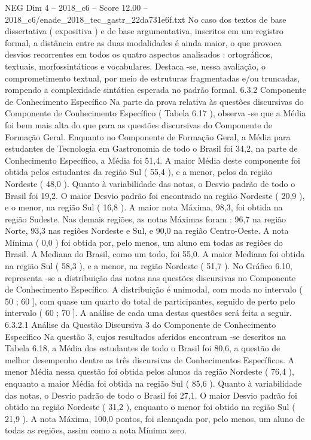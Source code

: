 \begin{textsample}{NEG Dim 4 – 2018\_c6 – Score 12.00 – 2018\_c6/enade\_2018\_tec\_gastr\_22da731e6f.txt}
No caso dos textos de base dissertativa ( expositiva ) e de base argumentativa, inscritos em um registro formal, a distância entre as duas modalidades é ainda maior, o que provoca desvios recorrentes em todos os quatro aspectos analisados : ortográficos, textuais, morfossintáticos e vocabulares.
Destaca -se, nessa avaliação, o comprometimento textual, por meio de estruturas fragmentadas e/ou truncadas, rompendo a complexidade sintática esperada no padrão formal. 6.3.2 Componente de Conhecimento Específico Na parte da prova relativa às questões discursivas do Componente de Conhecimento Específico ( Tabela 6.17 ), observa -se que a Média foi bem mais alta do que para as questões discursivas do Componente de Formação Geral.
Enquanto no Componente de Formação Geral, a Média para estudantes de Tecnologia em Gastronomia de todo o Brasil foi 34,2, na parte de Conhecimento Específico, a Média foi 51,4.
A maior Média deste componente foi obtida pelos estudantes da região Sul ( 55,4 ), e a menor, pelos da região Nordeste ( 48,0 ).
Quanto à variabilidade das notas, o Desvio padrão de todo o Brasil foi 19,2.
O maior Desvio padrão foi encontrado na região Nordeste ( 20,9 ), e o menor, na região Sul ( 16,8 ).
A maior nota Máxima, 98,3, foi obtida na região Sudeste.
Nas demais regiões, as notas Máximas foram : 96,7 na região Norte, 93,3 nas regiões Nordeste e Sul, e 90,0 na região Centro-Oeste.
A nota Mínima ( 0,0 ) foi obtida por, pelo menos, um aluno em todas as regiões do Brasil.
A Mediana do Brasil, como um todo, foi 55,0.
A maior Mediana foi obtida na região Sul ( 58,3 ), e a menor, na região Nordeste ( 51,7 ).
No Gráfico 6.10, representa -se a distribuição das notas nas questões discursivas no Componente de Conhecimento Específico.
A distribuição é unimodal, com moda no intervalo ( 50 ; 60 ], com quase um quarto do total de participantes, seguido de perto pelo intervalo ( 60 ; 70 ].
A análise de cada uma destas questões será feita a seguir. 6.3.2.1 Análise da Questão Discursiva 3 do Componente de Conhecimento Específico Na questão 3, cujos resultados aferidos encontram -se descritos na Tabela 6.18, a Média dos estudantes de todo o Brasil foi 80,6, a questão de melhor desempenho dentre as três discursivas de Conhecimentos Específicos.
A menor Média nessa questão foi obtida pelos alunos da região Nordeste ( 76,4 ), enquanto a maior Média foi obtida na região Sul ( 85,6 ).
Quanto à variabilidade das notas, o Desvio padrão de todo o Brasil foi 27,1.
O maior Desvio padrão foi obtido na região Nordeste ( 31,2 ), enquanto o menor foi obtido na região Sul ( 21,9 ).
A nota Máxima, 100,0 pontos, foi alcançada por, pelo menos, um aluno de todas as regiões, assim como a nota Mínima zero.

\end{textsample}
